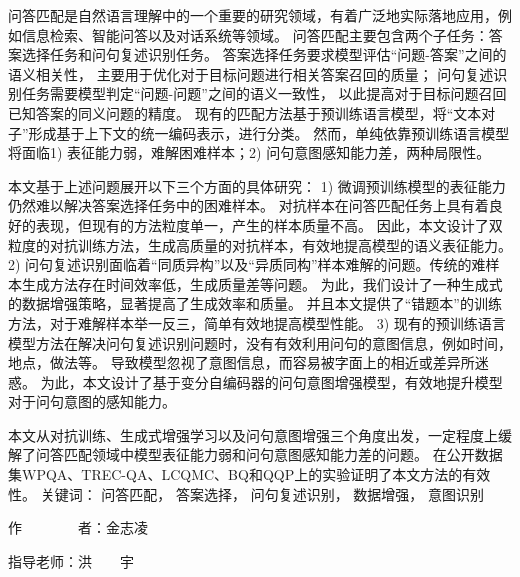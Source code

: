 
\begin{cabstract}

	问答匹配是自然语言理解中的一个重要的研究领域，有着广泛地实际落地应用，例如信息检索、智能问答以及对话系统等领域。
	问答匹配主要包含两个子任务：答案选择任务和问句复述识别任务。
	答案选择任务要求模型评估“问题-答案”之间的语义相关性，
	主要用于优化对于目标问题进行相关答案召回的质量；
	问句复述识别任务需要模型判定“问题-问题”之间的语义一致性，
	以此提高对于目标问题召回已知答案的同义问题的精度。
	现有的匹配方法基于预训练语言模型，将“文本对子”形成基于上下文的统一编码表示，进行分类。
	然而，单纯依靠预训练语言模型将面临1) 表征能力弱，难解困难样本；2) 问句意图感知能力差，两种局限性。


	本文基于上述问题展开以下三个方面的具体研究：
	1) 微调预训练模型的表征能力仍然难以解决答案选择任务中的困难样本。
	对抗样本在问答匹配任务上具有着良好的表现，但现有的方法粒度单一，产生的样本质量不高。
	因此，本文设计了双粒度的对抗训练方法，生成高质量的对抗样本，有效地提高模型的语义表征能力。
	2) 问句复述识别面临着“同质异构”以及“异质同构”样本难解的问题。传统的难样本生成方法存在时间效率低，生成质量差等问题。
	为此，我们设计了一种生成式的数据增强策略，显著提高了生成效率和质量。
	并且本文提供了“错题本”的训练方法，对于难解样本举一反三，简单有效地提高模型性能。
	3) 现有的预训练语言模型方法在解决问句复述识别问题时，没有有效利用问句的意图信息，例如时间，地点，做法等。
	导致模型忽视了意图信息，而容易被字面上的相近或差异所迷惑。
	为此，本文设计了基于变分自编码器的问句意图增强模型，有效地提升模型对于问句意图的感知能力。

	本文从对抗训练、生成式增强学习以及问句意图增强三个角度出发，一定程度上缓解了问答匹配领域中模型表征能力弱和问句意图感知能力差的问题。
	在公开数据集WPQA、TREC-QA、LCQMC、BQ和QQP上的实验证明了本文方法的有效性。
	\vskip 10bp
	\noindent
	{\heiti{} 关键词：}
	问答匹配，
	答案选择，
	问句复述识别，
	数据增强，
	意图识别
	
	\begin{flushright}
		{\heiti{} 作~~~~~~~~者：}金志凌

		{\heiti{} 指导老师：}洪~~~~宇
	\end{flushright}

\end{cabstract}


